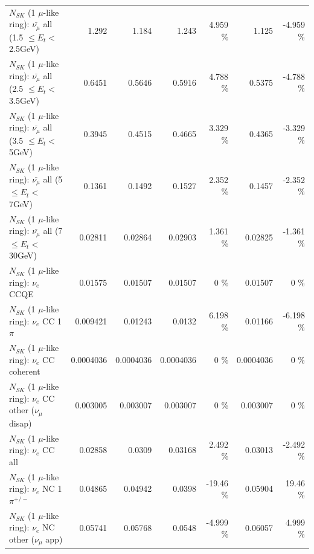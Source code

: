 \begin{table}
\begin{tabular}{| l | r | r | r  r | r  r |}
 $N_{SK}$ (1 $\mu$-like ring): $\bar{\nu_{\mu}}$ all (1.5 $\leq E_{t} <$ 2.5GeV) &           1.292 &           1.184 &           1.243 &    4.959 \%  &           1.125 &   -4.959 \%  \\ 
 $N_{SK}$ (1 $\mu$-like ring): $\bar{\nu_{\mu}}$ all (2.5 $\leq E_{t} <$ 3.5GeV) &          0.6451 &          0.5646 &          0.5916 &    4.788 \%  &          0.5375 &   -4.788 \%  \\ 
   $N_{SK}$ (1 $\mu$-like ring): $\bar{\nu_{\mu}}$ all (3.5 $\leq E_{t} <$ 5GeV) &          0.3945 &          0.4515 &          0.4665 &    3.329 \%  &          0.4365 &   -3.329 \%  \\ 
     $N_{SK}$ (1 $\mu$-like ring): $\bar{\nu_{\mu}}$ all (5 $\leq E_{t} <$ 7GeV) &          0.1361 &          0.1492 &          0.1527 &    2.352 \%  &          0.1457 &   -2.352 \%  \\ 
    $N_{SK}$ (1 $\mu$-like ring): $\bar{\nu_{\mu}}$ all (7 $\leq E_{t} <$ 30GeV) &         0.02811 &         0.02864 &         0.02903 &    1.361 \%  &         0.02825 &   -1.361 \%  \\ 
\hline
\hline
\hline
                                      $N_{SK}$ (1 $\mu$-like ring): $\nu_e$ CCQE &         0.01575 &         0.01507 &         0.01507 &        0 \%  &         0.01507 &        0 \%  \\ 
                                 $N_{SK}$ (1 $\mu$-like ring): $\nu_e$ CC 1$\pi$ &        0.009421 &         0.01243 &          0.0132 &    6.198 \%  &         0.01166 &   -6.198 \%  \\ 
                               $N_{SK}$ (1 $\mu$-like ring): $\nu_e$ CC coherent &       0.0004036 &       0.0004036 &       0.0004036 &        0 \%  &       0.0004036 &        0 \%  \\ 
                $N_{SK}$ (1 $\mu$-like ring): $\nu_e$ CC other ($\nu_\mu$ disap) &        0.003005 &        0.003007 &        0.003007 &        0 \%  &        0.003007 &        0 \%  \\ 
                                  $N_{SK}$ (1 $\mu$-like ring): $\nu_{e}$ CC all &         0.02858 &          0.0309 &         0.03168 &    2.492 \%  &         0.03013 &   -2.492 \%  \\ 
\hline
                           $N_{SK}$ (1 $\mu$-like ring): $\nu_e$ NC 1$\pi^{+/-}$ &         0.04865 &         0.04942 &          0.0398 &   -19.46 \%  &         0.05904 &    19.46 \%  \\ 
                  $N_{SK}$ (1 $\mu$-like ring): $\nu_e$ NC other ($\nu_\mu$ app) &         0.05741 &         0.05768 &          0.0548 &   -4.999 \%  &         0.06057 &    4.999 \%  \\ 

\end{tabular}
\end{table}
